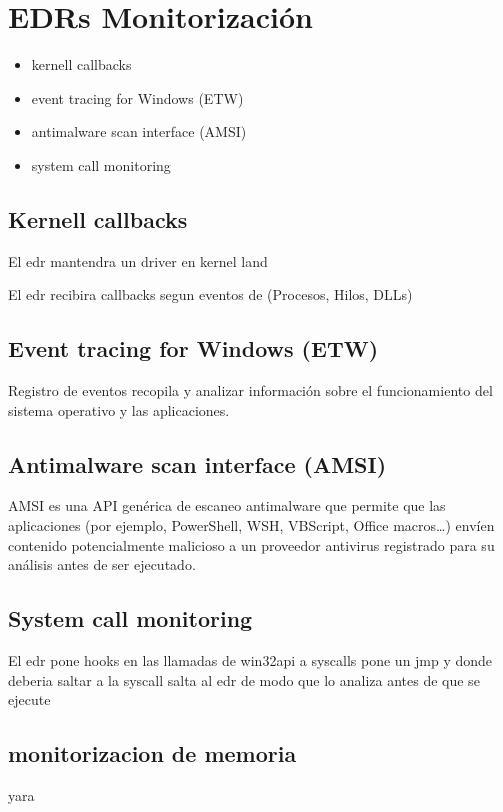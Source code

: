 \chapter{EDRs Monitorización}

\begin{itemize}
    \item kernell callbacks
    \item event tracing for Windows (ETW)
    \item antimalware scan interface (AMSI)
    \item system call monitoring
\end{itemize}

\section{Kernell callbacks}

El edr mantendra un driver en kernel land

El edr recibira callbacks segun eventos de (Procesos, Hilos, DLLs)

\section{Event tracing for Windows (ETW)}

Registro de eventos recopila y analizar información sobre el funcionamiento 
del sistema operativo y las aplicaciones.

\section{Antimalware scan interface (AMSI)}

AMSI es una API genérica de escaneo antimalware que permite que las aplicaciones
(por ejemplo, PowerShell, WSH, VBScript, Office macros…) envíen contenido 
potencialmente malicioso a un proveedor antivirus registrado para su análisis 
antes de ser ejecutado.

\section{System call monitoring}

El edr pone hooks en las llamadas de win32api a syscalls
pone un jmp y donde deberia saltar a la syscall salta al edr de modo que lo 
analiza antes de que se ejecute

\section{monitorizacion de memoria}

yara
